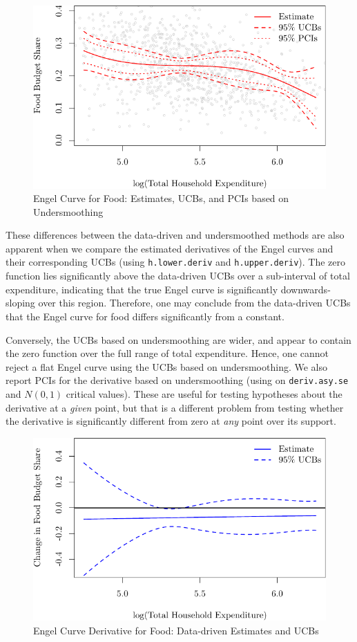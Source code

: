 \documentclass[
]{jss}
\begin{document}
\begin{figure}
\centering
\includegraphics{npiv_files/figure-latex/food-det-1.pdf}
\caption{Engel Curve for Food: Estimates, UCBs, and PCIs based on
Undersmoothing}
\end{figure}

These differences between the data-driven and undersmoothed methods are
also apparent when we compare the estimated derivatives of the Engel
curves and their corresponding UCBs (using \texttt{h.lower.deriv} and
\texttt{h.upper.deriv}). The zero function lies significantly above the
data-driven UCBs over a sub-interval of total expenditure, indicating
that the true Engel curve is significantly downwards-sloping over this
region. Therefore, one may conclude from the data-driven UCBs that the
Engel curve for food differs significantly from a constant.

Conversely, the UCBs based on undersmoothing are wider, and appear to
contain the zero function over the full range of total expenditure.
Hence, one cannot reject a flat Engel curve using the UCBs based on
undersmoothing. We also report PCIs for the derivative based on
undersmoothing (using on \texttt{deriv.asy.se} and \(N(0,1)\) critical
values). These are useful for testing hypotheses about the derivative at
a \emph{given} point, but that is a different problem from testing
whether the derivative is significantly different from zero at
\emph{any} point over its support.

\begin{figure}
\centering
\includegraphics{npiv_files/figure-latex/food-dd-deriv-1.pdf}
\caption{Engel Curve Derivative for Food: Data-driven Estimates and
UCBs}
\end{figure}
\end{document}
